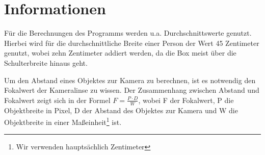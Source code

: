 \documentclass[12pt]{article}
\theoremstyle{definition}
\begin{document}
\section{Informationen}

\begin{flushleft}
Für die Berechnungen des Programms werden u.a. Durchschnittswerte genutzt. Hierbei wird für die durchschnittliche Breite einer Person der Wert 45 Zentimeter genutzt, wobei zehn Zentimeter addiert werden, da die Box meist über die Schulterbreite hinaus geht.

Um den Abstand eines Objektes zur Kamera zu berechnen, ist es notwendig den Fokalwert der Kameralinse zu wissen. Der Zusammenhang zwischen Abstand und Fokalwert zeigt sich in der Formel $F = \frac{P \cdot D}{W}$, wobei F der Fokalwert, P die Objektbreite in Pixel, D der Abstand des Objektes zur Kamera und W die Objektbreite in einer Maßeinheit\footnote{Wir verwenden hauptsächlich Zentimeter} ist.
\end{flushleft}
\end{document}
